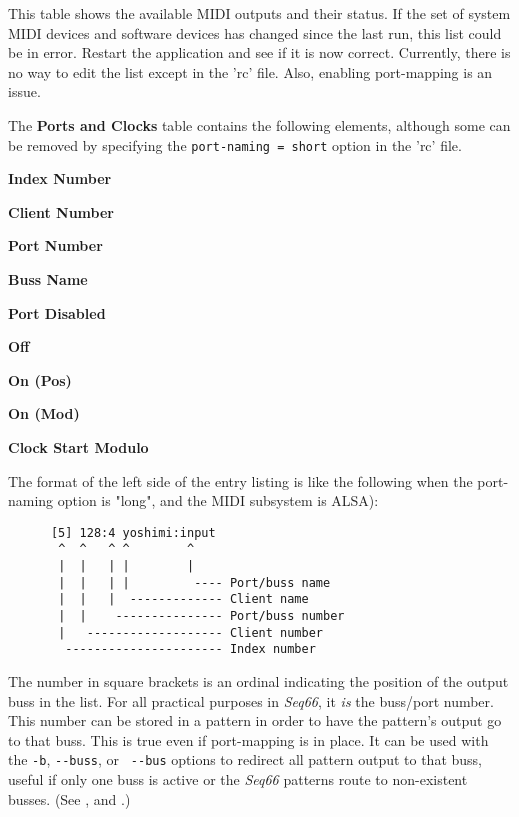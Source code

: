    \setcounter{ItemCounter}{0}      %


   This table shows the available MIDI outputs and their status.
   If the set of system MIDI devices and software devices has changed since
   the last run, this list could be in error.  Restart the application
   and see if it is now correct.  Currently, there is no way to edit the list
   except in the 'rc' file.  Also, enabling port-mapping is an issue.

   The \textbf{Ports and Clocks} table contains the following elements,
   although some can be removed by specifying the
   \texttt{port-naming = short} option in the 'rc' file.

   \begin{enumber}
      \item \textbf{Index Number}
      \item \textbf{Client Number}
      \item \textbf{Port Number}
      \item \textbf{Buss Name}
      \item \textbf{Port Disabled}
      \item \textbf{Off}
      \item \textbf{On (Pos)}
      \item \textbf{On (Mod)}
      \item \textbf{Clock Start Modulo}
   \end{enumber}

   The format of the left side of the entry listing is like the following
   when the port-naming option is "long", and the
   MIDI subsystem is ALSA):

   \begin{verbatim}
      [5] 128:4 yoshimi:input
       ^  ^   ^ ^        ^
       |  |   | |        |
       |  |   | |         ---- Port/buss name
       |  |   |  ------------- Client name
       |  |    --------------- Port/buss number
       |   ------------------- Client number
        ---------------------- Index number
   \end{verbatim}

   \setcounter{ItemCounter}{0}      %

   The number in square brackets is an ordinal indicating the position
   of the output buss in the list.
   For all practical purposes in \textsl{Seq66}, it \textsl{is} the
   buss/port number.  This number can be stored in a pattern in order to have
   the pattern's output go to that buss.  
   This is true even if port-mapping is in place.
   It can be used with the \texttt{-b},
   \texttt{-{}-buss}, or \texttt{ -{}-bus} options to redirect all
   pattern output to that buss, useful if only one buss is active or the
   \textsl{Seq66} patterns route to non-existent busses.
   (See ,
   and .)

